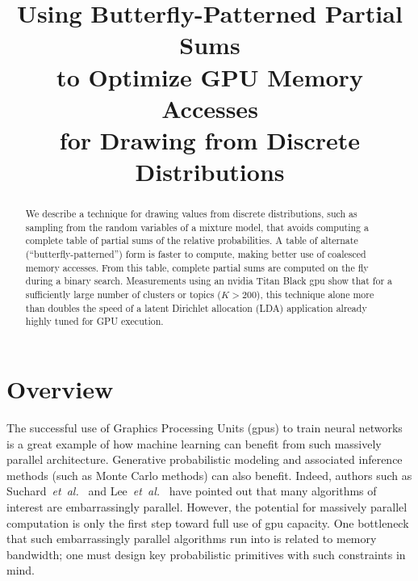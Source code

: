 \documentclass[10pt,nohyperref]{sigplanconf}
\begin{document}
 



\title{Using Butterfly-Patterned Partial Sums \\ to Optimize GPU Memory Accesses \\ for Drawing from Discrete Distributions}
\subtitle{}

\maketitle




\begin{abstract} 
We describe a technique for drawing values from discrete distributions,
such as sampling from the random variables of a mixture model,
that avoids computing a complete table of partial
sums of the relative probabilities.  A table of alternate
(``butterfly-patterned'') form is faster to compute, making
better use of coalesced memory accesses.  From this table,
complete partial sums are computed on the fly during a binary search.
Measurements using an {\sc nvidia} Titan Black {\sc gpu} show that for a sufficiently large number
of clusters or topics ($K > 200$), this technique alone more than doubles
the speed of a latent Dirichlet allocation ({\sc LDA}) application already highly tuned for GPU execution.
\end{abstract} 




\section{Overview}
\label{sec:overview}

The successful use of Graphics Processing Units ({\sc gpu}s) to train neural
networks is a great example of how machine learning can benefit from
such massively parallel architecture. Generative
probabilistic modeling \cite{Blei}
and associated inference methods (such as Monte Carlo
methods) can also benefit. Indeed,
authors such as Suchard~{\it et~al.}~\cite{suchard_understanding_2010} and
Lee~{\it et~al.}~\cite{lee_utility_journal_2010} have pointed out that many algorithms of
interest are embarrassingly parallel. However, the potential for massively
parallel computation is only the first step toward full
use of {\sc gpu} capacity.  One bottleneck that such embarrassingly parallel
algorithms run into is related to memory bandwidth; one must
design key probabilistic primitives with such constraints in mind.
\end{document}
